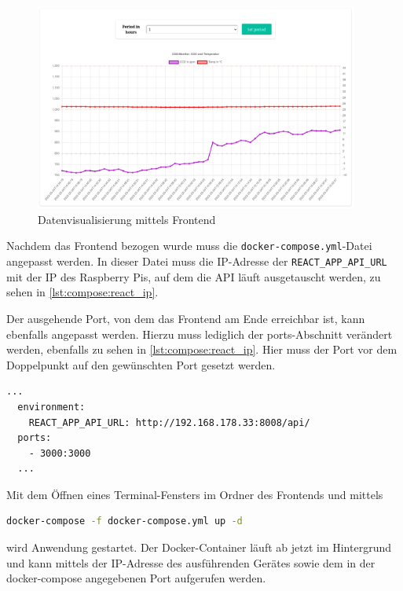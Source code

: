 \documentclass[a4paper,
    11pt,
    headings=small,
    ngerman,
    listof=totoc,
    numbers=noenddot]{scrreprt}[2021/11/13]
\begin{document}
\begin{figure}[htbp]
  \centering
  \includegraphics[width=0.95\textwidth]{pictures/Frontend.png}
  \caption{Datenvisualisierung mittels Frontend}
  \label{fig:frontend}
\end{figure}

Nachdem das Frontend bezogen wurde muss die \texttt{docker-compose.yml}-Datei angepasst werden. In dieser Datei muss die IP-Adresse der \texttt{REACT\_APP\_API\_URL} mit der IP des Raspberry Pis, auf dem die \ac{API} läuft ausgetauscht werden, zu sehen in \vref{lst:compose:react_ip}.

Der ausgehende Port, von dem das Frontend am Ende erreichbar ist, kann ebenfalls angepasst werden. Hierzu muss lediglich der ports-Abschnitt verändert werden, ebenfalls zu sehen in \vref{lst:compose:react_ip}. Hier muss der Port vor dem Doppelpunkt auf den gewünschten Port gesetzt werden.

\begin{lstlisting}[language=docker-compose-2,caption={Anpassen der \ac{API}-IP und des Ports in der docker-compose.yml},breaklines=true,label={lst:compose:react_ip}]
  ...
  environment:
    REACT_APP_API_URL: http://192.168.178.33:8008/api/
  ports:
    - 3000:3000
  ...
\end{lstlisting}

Mit dem Öffnen eines Terminal-Fensters im Ordner des Frontends und mittels

\begin{lstlisting}[language=Bash]
  docker-compose -f docker-compose.yml up -d
\end{lstlisting}

wird Anwendung gestartet. Der Docker-Container läuft ab jetzt im Hintergrund und kann mittels der IP-Adresse des ausführenden Gerätes sowie dem in der docker-compose angegebenen Port aufgerufen werden.
\end{document}
